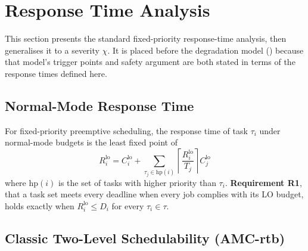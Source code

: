 \section{Response Time Analysis}
\label{sec:rta}

This section presents the standard fixed-priority response-time analysis, then
generalises it to a severity $\chi$. It is placed before the degradation model
() because that model's trigger points and safety argument
are both stated in terms of the response times defined here.

\subsection{Normal-Mode Response Time}
\label{sec:r-lo}

For fixed-priority preemptive scheduling, the response time of task $\tau_i$
under normal-mode budgets is the least fixed point of
\[
R_i^{\mathrm{lo}} = C_i^{\mathrm{lo}} + \sum_{\tau_j \in \mathrm{hp}(i)} \left\lceil \frac{R_i^{\mathrm{lo}}}{T_j} \right\rceil C_j^{\mathrm{lo}}
\]
where $\mathrm{hp}(i)$ is the set of tasks with higher priority than $\tau_i$.
\textbf{Requirement R1}, that a task set meets every deadline when every job
complies with its LO budget, holds exactly when $R_i^{\mathrm{lo}} \leq D_i$ for
every $\tau_i \in \tau$.

\subsection{Classic Two-Level Schedulability (AMC-rtb)}
\label{sec:amc-rtb}

